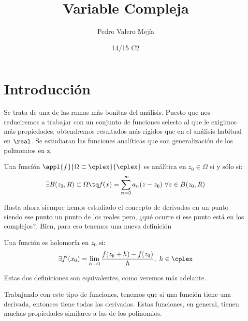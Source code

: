 \documentclass{apuntes}
\title{Variable Compleja}
\author{Pedro Valero Mejía}
\date{14/15 C2}
\begin{document}
\pagestyle{plain}
\maketitle

\tableofcontents
\newpage
\chapter{Introducción}
Se trata de una de las ramas más bonitas del análisis. Puesto que nos reduciremos a trabajar con un conjunto de funciones selecto al que le exigimos más propiedades, obtendremos resultados más rígidos que en el análisis habitual en $\real$. Se estudiaran las funciones analíticas que son generalización de los polinomios en z.

\begin{defn}
Una funcíón $\appl{f}{\Omega \subset \cplex}{\cplex}$ es análítica en $z_0\in\Omega$ si y sólo si:
\[\exists B(z_0,R)\subset \Omega \tq f(x)=\sum_{n=0}^{\infty}a_n(z-z_0) \ \forall z \in B(z_0, R)\]
\end{defn}

Hasta ahora siempre hemos estudiado el concepto de derivadas en un punto siendo ese punto un punto de los reales pero, ¿qué ocurre si ese punto está en los complejos?. Bien, para eso tenemos una nueva definición

\begin{defn}
Una función es holomorfa en $z_0$ si:
\[\exists f'(x_0)=\lim_{h \to 0}\frac{f(z_0+h)-f(z_0)}{h}, \ h \in \cplex\]
\end{defn}

Estas dos definiciones son equivalentes, como veremos más adelante.

Trabajando con este tipo de funciones, tenemos que si una función tiene una derivada, entonces tiene todas las derivadas. Estas funciones, en general, tienen muchas propiedades similares a las de los polinomios.
\end{document}
